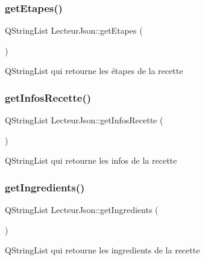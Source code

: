 \subsubsection{\texorpdfstring{get\+Etapes()}{getEtapes()}}
{\footnotesize\ttfamily Q\+String\+List Lecteur\+Json\+::get\+Etapes (\begin{DoxyParamCaption}{ }\end{DoxyParamCaption})\hspace{0.3cm}{\ttfamily [inline]}}

Q\+String\+List qui retourne les étapes de la recette \mbox{\label{class_lecteur_json_a0c507870050e16de3688d310d1f3b65a}} 
\subsubsection{\texorpdfstring{get\+Infos\+Recette()}{getInfosRecette()}}
{\footnotesize\ttfamily Q\+String\+List Lecteur\+Json\+::get\+Infos\+Recette (\begin{DoxyParamCaption}{ }\end{DoxyParamCaption})\hspace{0.3cm}{\ttfamily [inline]}}

Q\+String\+List qui retourne les infos de la recette \mbox{\label{class_lecteur_json_a0c18d502de54aea85b4d76f1b2858423}} 
\subsubsection{\texorpdfstring{get\+Ingredients()}{getIngredients()}}
{\footnotesize\ttfamily Q\+String\+List Lecteur\+Json\+::get\+Ingredients (\begin{DoxyParamCaption}{ }\end{DoxyParamCaption})\hspace{0.3cm}{\ttfamily [inline]}}

Q\+String\+List qui retourne les ingredients de la recette \mbox{\label{class_lecteur_json_a88d73523c1775a8c7001b5abae152740}} 
